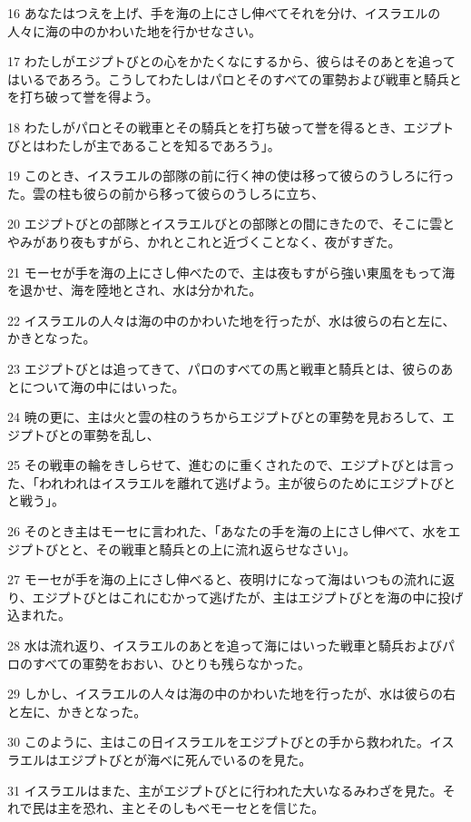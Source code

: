 \par 16 あなたはつえを上げ、手を海の上にさし伸べてそれを分け、イスラエルの人々に海の中のかわいた地を行かせなさい。
\par 17 わたしがエジプトびとの心をかたくなにするから、彼らはそのあとを追ってはいるであろう。こうしてわたしはパロとそのすべての軍勢および戦車と騎兵とを打ち破って誉を得よう。
\par 18 わたしがパロとその戦車とその騎兵とを打ち破って誉を得るとき、エジプトびとはわたしが主であることを知るであろう」。
\par 19 このとき、イスラエルの部隊の前に行く神の使は移って彼らのうしろに行った。雲の柱も彼らの前から移って彼らのうしろに立ち、
\par 20 エジプトびとの部隊とイスラエルびとの部隊との間にきたので、そこに雲とやみがあり夜もすがら、かれとこれと近づくことなく、夜がすぎた。
\par 21 モーセが手を海の上にさし伸べたので、主は夜もすがら強い東風をもって海を退かせ、海を陸地とされ、水は分かれた。
\par 22 イスラエルの人々は海の中のかわいた地を行ったが、水は彼らの右と左に、かきとなった。
\par 23 エジプトびとは追ってきて、パロのすべての馬と戦車と騎兵とは、彼らのあとについて海の中にはいった。
\par 24 暁の更に、主は火と雲の柱のうちからエジプトびとの軍勢を見おろして、エジプトびとの軍勢を乱し、
\par 25 その戦車の輪をきしらせて、進むのに重くされたので、エジプトびとは言った、「われわれはイスラエルを離れて逃げよう。主が彼らのためにエジプトびとと戦う」。
\par 26 そのとき主はモーセに言われた、「あなたの手を海の上にさし伸べて、水をエジプトびとと、その戦車と騎兵との上に流れ返らせなさい」。
\par 27 モーセが手を海の上にさし伸べると、夜明けになって海はいつもの流れに返り、エジプトびとはこれにむかって逃げたが、主はエジプトびとを海の中に投げ込まれた。
\par 28 水は流れ返り、イスラエルのあとを追って海にはいった戦車と騎兵およびパロのすべての軍勢をおおい、ひとりも残らなかった。
\par 29 しかし、イスラエルの人々は海の中のかわいた地を行ったが、水は彼らの右と左に、かきとなった。
\par 30 このように、主はこの日イスラエルをエジプトびとの手から救われた。イスラエルはエジプトびとが海べに死んでいるのを見た。
\par 31 イスラエルはまた、主がエジプトびとに行われた大いなるみわざを見た。それで民は主を恐れ、主とそのしもべモーセとを信じた。

